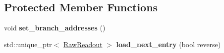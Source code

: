 \subsection*{Protected Member Functions}
\begin{DoxyCompactItemize}
\item 
\hypertarget{classannie_1_1RawReader_aa097eb3c009619f29f7fc2134016b275}{void {\bfseries set\-\_\-branch\-\_\-addresses} ()}\label{classannie_1_1RawReader_aa097eb3c009619f29f7fc2134016b275}

\item 
\hypertarget{classannie_1_1RawReader_aafa30153f901063d8294fd9a76bf5058}{std\-::unique\-\_\-ptr$<$ \hyperlink{classannie_1_1RawReadout}{Raw\-Readout} $>$ {\bfseries load\-\_\-next\-\_\-entry} (bool reverse)}\label{classannie_1_1RawReader_aafa30153f901063d8294fd9a76bf5058}

\end{DoxyCompactItemize}

